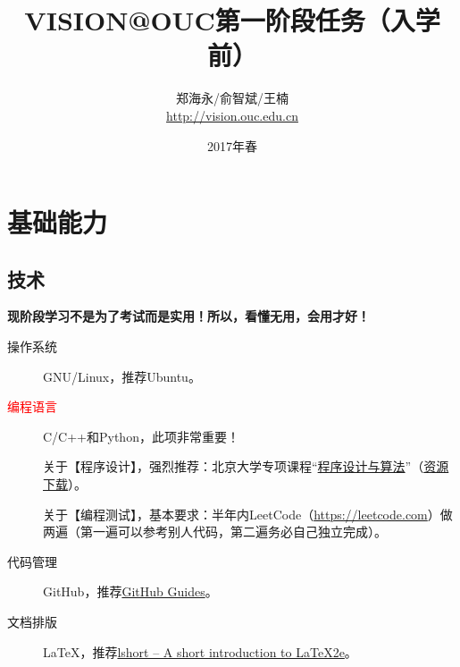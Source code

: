 \documentclass[14pt,a4paper]{extarticle}
\begin{document}
\title{\vspace{-2em}VISION@OUC第一阶段任务（入学前）\vspace{-0.7em}}
\author{郑海永/俞智斌/王楠\\\url{http://vision.ouc.edu.cn}}
\date{\vspace{-0.7em}2017年春\vspace{-0.7em}}
\maketitle\thispagestyle{fancy}
\maketitle
\tableofcontents

\section{基础能力}

\subsection{技术}

\textbf{现阶段学习不是为了考试而是实用！所以，看懂无用，会用才好！}

\begin{description}
\item[操作系统] GNU/Linux，推荐Ubuntu。
\item[\textcolor{red}{编程语言}] C/C++和Python，此项非常重要！

关于【程序设计】，强烈推荐：北京大学专项课程“\href{https://www.coursera.org/specializations/biancheng-suanfa}{程序设计与算法}”（\href{http://vision.ouc.edu.cn/~zhenghaiyong/courses/oop/2017spring/mooc/}{资源下载}）。

关于【编程测试】，基本要求：半年内LeetCode（\url{https://leetcode.com}）做两遍（第一遍可以参考别人代码，第二遍务必自己独立完成）。
\item[代码管理] GitHub，推荐\href{https://guides.github.com/}{GitHub Guides}。
\item[文档排版] \LaTeX{}，推荐\href{https://www.ctan.org/tex-archive/info/lshort/}{lshort – A short in­tro­duc­tion to \LaTeX2e{}}。
\end{description}
\end{document}
